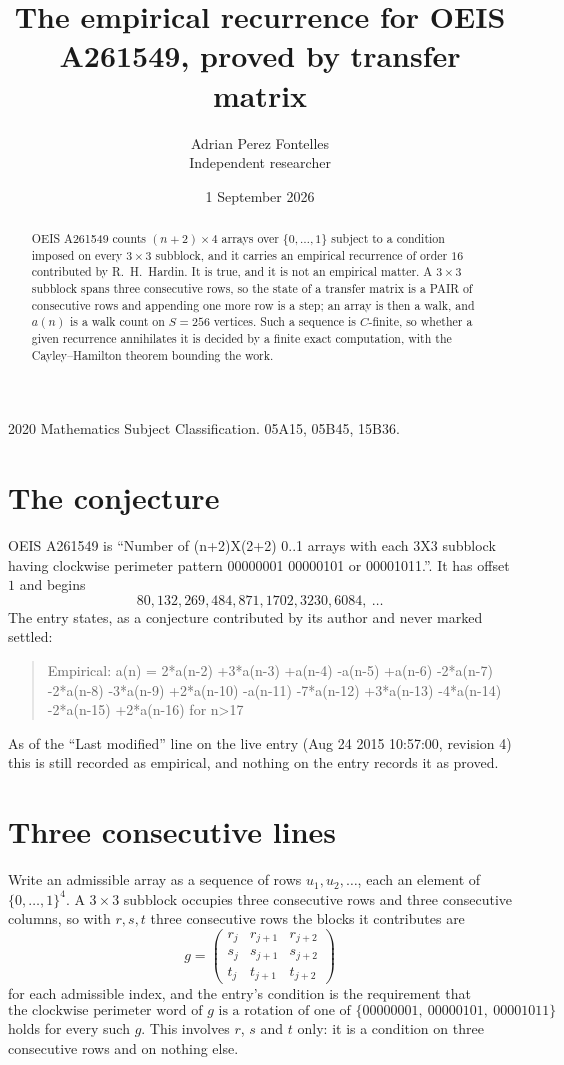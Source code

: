 \documentclass[11pt,a4paper]{article}
\title{The empirical recurrence for OEIS A261549, proved by transfer matrix}
\author{Adrian Perez Fontelles\\ \small Independent researcher}
\date{1 September 2026}
\theoremstyle{plain}
\theoremstyle{definition}
\begin{document}
\maketitle

\begin{abstract}
OEIS A261549 counts $(n+2)\times4$ arrays over $\{0,\dots,1\}$ subject to a condition imposed on
every $3\times3$ subblock, and it carries an empirical recurrence of order $16$
contributed by R.~H.~Hardin. It is true, and it is not an empirical matter. A $3\times3$
subblock spans three consecutive rows, so the state of a transfer matrix is a PAIR of
consecutive rows and appending one more row is a step; an array is then a walk, and
$a(n)$ is a walk count on $S=256$ vertices. Such a sequence is $C$-finite, so whether a given
recurrence annihilates it is decided by a finite exact computation, with the Cayley--Hamilton
theorem bounding the work.
\end{abstract}

\noindent\small 2020 Mathematics Subject Classification. 05A15, 05B45, 15B36.\normalsize

\section{The conjecture}

OEIS A261549 is ``Number of (n+2)X(2+2) 0..1 arrays with each 3X3 subblock having clockwise perimeter pattern 00000001 00000101 or 00001011.''. It has offset $1$ and begins
\[
80, 132, 269, 484, 871, 1702, 3230, 6084,\ \dots
\]
The entry states, as a conjecture contributed by its author and never marked settled:
\begin{quote}
Empirical: a(n) = 2*a(n-2) +3*a(n-3) +a(n-4) -a(n-5) +a(n-6) -2*a(n-7) -2*a(n-8) -3*a(n-9) +2*a(n-10) -a(n-11) -7*a(n-12) +3*a(n-13) -4*a(n-14) -2*a(n-15) +2*a(n-16) for n>17
\end{quote}
As of the ``Last modified'' line on the live entry (Aug 24 2015 10:57:00, revision 4) this is still
recorded as empirical, and nothing on the entry records it as proved.

\section{Three consecutive lines}

Write an admissible array as a sequence of rows $u_1,u_2,\dots$, each an element of
$\{0,\dots,1\}^{4}$. A $3\times3$ subblock occupies three consecutive rows and
three consecutive columns, so with $r,s,t$ three consecutive rows the blocks it
contributes are
\[
g=\begin{pmatrix}r_j&r_{j+1}&r_{j+2}\\ s_j&s_{j+1}&s_{j+2}\\ t_j&t_{j+1}&t_{j+2}\end{pmatrix}
\]
for each admissible index, and the entry's condition is the requirement that
\[
\text{the clockwise perimeter word of }g\text{ is a rotation of one of }\{00000001,\ 00000101,\ 00001011\}
\]
holds for every such $g$. This involves $r$, $s$ and $t$ only: it is a condition on
three consecutive rows and on nothing else.
\end{document}
